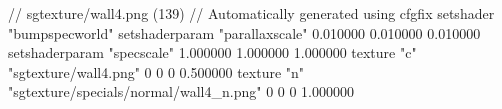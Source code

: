 // sgtexture/wall4.png (139)
// Automatically generated using cfgfix
setshader "bumpspecworld"
setshaderparam "parallaxscale" 0.010000 0.010000 0.010000
setshaderparam "specscale" 1.000000 1.000000 1.000000
texture "c" "sgtexture/wall4.png" 0 0 0 0.500000
texture "n" "sgtexture/specials/normal/wall4_n.png" 0 0 0 1.000000
